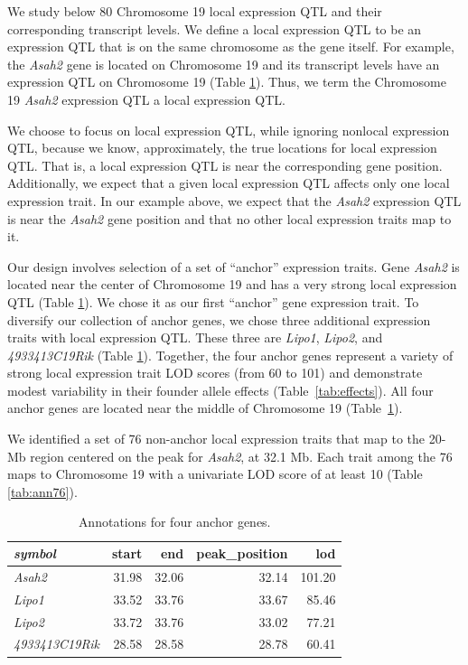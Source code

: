 \documentclass{article}
\begin{document}
We study below 80 Chromosome 19 local expression QTL and their corresponding transcript levels. We define a local expression QTL to be an expression QTL that is on the same chromosome as the gene itself. For example, the \emph{Asah2} gene is located on Chromosome 19 and its transcript levels have an expression QTL on Chromosome 19 (Table \ref{tab:ann4}). Thus, we term the Chromosome 19 \emph{Asah2} expression QTL a local expression QTL. 

We choose to focus on local expression QTL, while ignoring nonlocal expression QTL, because we know, approximately, the true locations for local expression QTL. That is, a local expression QTL is near the corresponding gene position. Additionally, we expect that a given local expression QTL affects only one local expression trait. In our example above, we expect that the \emph{Asah2} expression QTL is near the \emph{Asah2} gene position and that no other local expression traits map to it.


Our design involves selection of a set of ``anchor'' expression traits. Gene \emph{Asah2} is located near the center of Chromosome 19 and has a very strong local expression QTL (Table \ref{tab:ann4}). We chose it as our first ``anchor'' gene expression trait. To diversify our collection of anchor genes, we chose three additional expression traits with local expression QTL. These three are \emph{Lipo1}, \emph{Lipo2}, and \emph{4933413C19Rik} (Table \ref{tab:ann4}). Together, the four anchor genes represent a variety of strong local expression trait LOD scores (from 60 to 101) and demonstrate modest variability in their founder allele effects (Table~\ref{tab:effects}). All four anchor genes are located near the middle of Chromosome 19 (Table~\ref{tab:ann4}). 




We identified a set of 76 non-anchor local expression traits that map to the 20-Mb region centered on the peak for \emph{Asah2}, at 32.1 Mb. Each trait among the 76 maps to Chromosome 19 with a univariate LOD score of at least 10 (Table \ref{tab:ann76}). 


\begin{table}[ht]
\caption{Annotations for four anchor genes.}\label{tab:ann4}
\centering
\begin{tabular}{>{\em}lrrrr}
  \hline
symbol & start & end & peak\_position & lod \\ 
  \hline
Asah2 & 31.98 & 32.06 & 32.14 & 101.20 \\ 
  Lipo1 & 33.52 & 33.76 & 33.67 & 85.46 \\ 
  Lipo2 & 33.72 & 33.76 & 33.02 & 77.21 \\ 
  4933413C19Rik & 28.58 & 28.58 & 28.78 & 60.41 \\ 
   \hline
\end{tabular}
\end{table}
\end{document}
